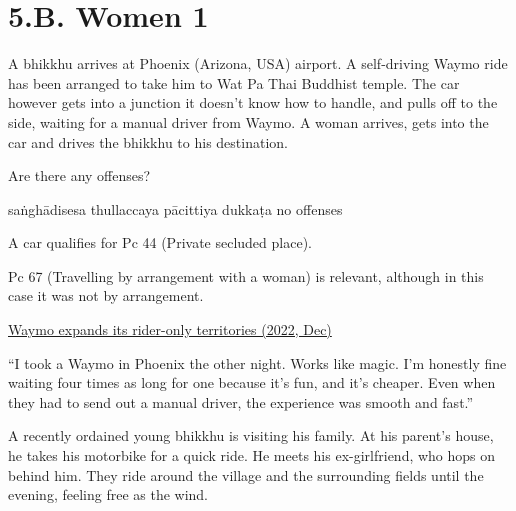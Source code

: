 \chapter{5.B. Women 1}
\renewcommand*{\theChapterTitle}{5.B. Women 1}

\begin{exam}{\autoExamName}

\begin{problem}

  A bhikkhu arrives at Phoenix (Arizona, USA) airport. A self-driving Waymo ride
  has been arranged to take him to Wat Pa Thai Buddhist temple. The car however
  gets into a junction it doesn't know how to handle, and pulls off to the side,
  waiting for a manual driver from Waymo. A woman arrives, gets into the car and
  drives the bhikkhu to his destination.

  Are there any offenses?

  \begin{answers}{5}
    \bChoices
     saṅghādisesa\eAns
     thullaccaya\eAns
     pācittiya\eAns
     dukkaṭa\eAns
     no offenses\eAns
    \eChoices
  \end{answers}

  \begin{solution}
    A car qualifies for Pc 44 (Private secluded place).

    Pc 67 (Travelling by arrangement with a woman) is relevant, although in this case it was not by arrangement.

    \href{https://news.ycombinator.com/item?id=34038562}{Waymo expands its rider-only territories (2022, Dec)}

    ``I took a Waymo in Phoenix the other night. Works like magic. I’m honestly
    fine waiting four times as long for one because it’s fun, and it’s cheaper.
    Even when they had to send out a manual driver, the experience was smooth
    and fast.''
  \end{solution}

\end{problem}

\problemDivide

\begin{problem}
  A recently ordained young bhikkhu is visiting his family. At his parent's
  house, he takes his motorbike for a quick ride. He meets his ex-girlfriend,
  who hops on behind him. They ride around the village and the surrounding
  fields until the evening, feeling free as the wind.


\end{problem}
\end{exam}
